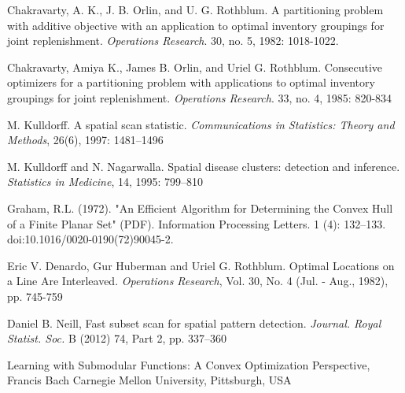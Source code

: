 \documentclass{article}
\theoremstyle{case}
\begin{document}
\begin{thebibliography}{1}

    Chakravarty, A. K., J. B. Orlin, and U. G. Rothblum. A partitioning problem with additive objective with an application to optimal inventory groupings for joint replenishment. {\em Operations Research}. 30, no. 5, 1982: 1018-1022.

     Chakravarty, Amiya K., James B. Orlin, and Uriel G. Rothblum. Consecutive optimizers for a partitioning problem with applications to optimal inventory groupings for joint replenishment. {\em Operations Research}. 33, no. 4, 1985: 820-834

	 M. Kulldorff. A spatial scan statistic. {\em Communications in Statistics: Theory and Methods}, 26(6), 1997: 1481–1496

	 M. Kulldorff and N. Nagarwalla. Spatial disease clusters: detection and inference. {\em Statistics in Medicine}, 14, 1995: 799–810
	
	 Graham, R.L. (1972). "An Efficient Algorithm for Determining the Convex Hull of a Finite Planar Set" (PDF). Information Processing Letters. 1 (4): 132–133. doi:10.1016/0020-0190(72)90045-2.	
	
	 Eric V. Denardo, Gur Huberman and Uriel G. Rothblum. Optimal Locations on a Line Are Interleaved. {\em Operations Research}, Vol. 30, No. 4 (Jul. - Aug., 1982), pp. 745-759

	 Daniel B. Neill, Fast subset scan for spatial pattern detection. {\em Journal. Royal Statist. Soc.} B (2012) 74, Part 2, pp. 337–360
	
	 Learning with Submodular Functions: A Convex Optimization Perspective, Francis Bach Carnegie Mellon University, Pittsburgh, USA

\end{thebibliography}
\end{document}
